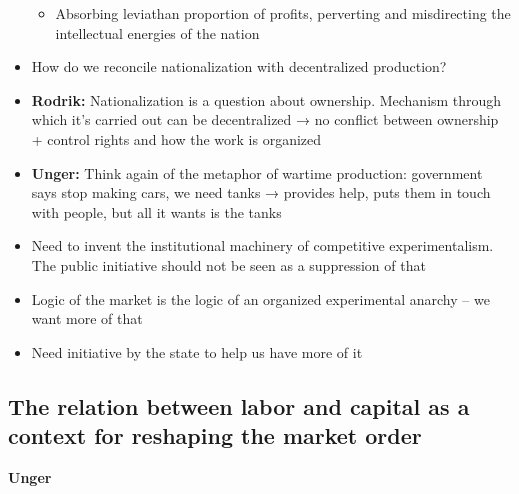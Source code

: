 \begin{itemize}
  \begin{itemize}
  \tightlist
  \item
    Absorbing leviathan proportion of profits, perverting and
    misdirecting the intellectual energies of the nation
  \end{itemize}
\item
  How do we reconcile nationalization with decentralized production?
\item
  \textbf{Rodrik:} Nationalization is a question about ownership.
  Mechanism through which it's carried out can be decentralized → no
  conflict between ownership + control rights and how the work is
  organized
\item
  \textbf{Unger:} Think again of the metaphor of wartime production:
  government says stop making cars, we need tanks → provides help, puts
  them in touch with people, but all it wants is the tanks
\item
  Need to invent the institutional machinery of competitive
  experimentalism. The public initiative should not be seen as a
  suppression of that
\item
  Logic of the market is the logic of an organized experimental anarchy
  -- we want more of that
\item
  Need initiative by the state to help us have more of it
\end{itemize}

\hypertarget{the-relation-between-labor-and-capital-as-a-context-for-reshaping-the-market-order}{%
\subsection{The relation between labor and capital as a context for
reshaping the market
order}\label{the-relation-between-labor-and-capital-as-a-context-for-reshaping-the-market-order}}

\textbf{Unger}

